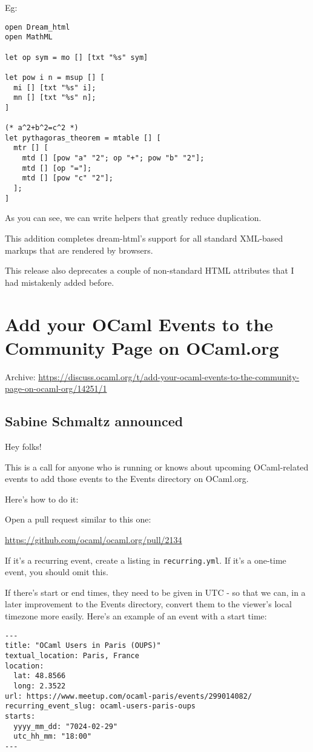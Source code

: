 \documentclass[11pt]{article}
\begin{document}
Eg:

\begin{verbatim}
open Dream_html
open MathML

let op sym = mo [] [txt "%s" sym]

let pow i n = msup [] [
  mi [] [txt "%s" i];
  mn [] [txt "%s" n];
]

(* a^2+b^2=c^2 *)
let pythagoras_theorem = mtable [] [
  mtr [] [
    mtd [] [pow "a" "2"; op "+"; pow "b" "2"];
    mtd [] [op "="];
    mtd [] [pow "c" "2"];
  ];
]
\end{verbatim}

As you can see, we can write helpers that greatly reduce duplication.

This addition completes dream-html's support for all standard XML-based markups that are rendered by browsers.

This release also deprecates a couple of non-standard HTML attributes that I had mistakenly added before.
\section*{Add your OCaml Events to the Community Page on OCaml.org}
\label{15}
Archive: \url{https://discuss.ocaml.org/t/add-your-ocaml-events-to-the-community-page-on-ocaml-org/14251/1}
\subsection*{Sabine Schmaltz announced}
\label{sec:org4085b9d}


Hey folks!

This is a call for anyone who is running or knows about upcoming OCaml-related events to add those events to the
Events directory on OCaml.org.

Here's how to do it:

Open a pull request similar to this one:

\url{https://github.com/ocaml/ocaml.org/pull/2134}

If it's a recurring event, create a listing in \texttt{recurring.yml}. If it's a one-time event, you should omit this.

If there's start or end times, they need to be given in UTC - so that we can, in a later improvement to the Events
directory, convert them to the viewer's local timezone more easily. Here's an example of an event with a start
time:

\begin{verbatim}
---
title: "OCaml Users in Paris (OUPS)"
textual_location: Paris, France
location:
  lat: 48.8566
  long: 2.3522
url: https://www.meetup.com/ocaml-paris/events/299014082/
recurring_event_slug: ocaml-users-paris-oups
starts:
  yyyy_mm_dd: "7024-02-29"
  utc_hh_mm: "18:00"
---
\end{verbatim}
\end{document}
